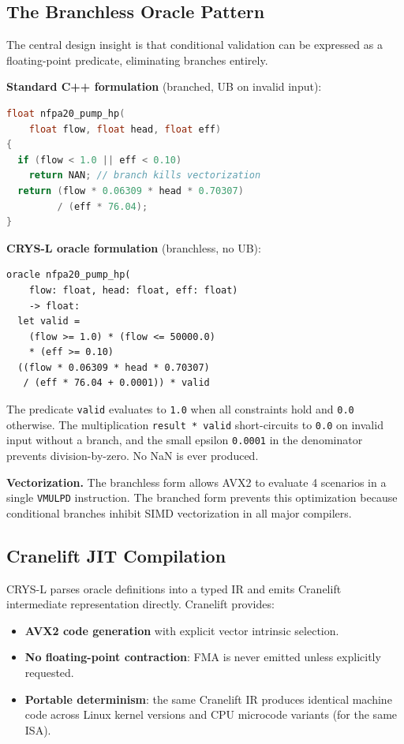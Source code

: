 \documentclass[10pt,twocolumn]{article}
\begin{document}
\subsection{The Branchless Oracle Pattern}

The central design insight is that conditional validation can be expressed as a
floating-point predicate, eliminating branches entirely.

\textbf{Standard C++ formulation} (branched, UB on invalid input):
\begin{lstlisting}[language=C++]
float nfpa20_pump_hp(
    float flow, float head, float eff)
{
  if (flow < 1.0 || eff < 0.10)
    return NAN; // branch kills vectorization
  return (flow * 0.06309 * head * 0.70307)
         / (eff * 76.04);
}
\end{lstlisting}

\textbf{CRYS-L oracle formulation} (branchless, no UB):
\begin{lstlisting}
oracle nfpa20_pump_hp(
    flow: float, head: float, eff: float)
    -> float:
  let valid =
    (flow >= 1.0) * (flow <= 50000.0)
    * (eff >= 0.10)
  ((flow * 0.06309 * head * 0.70307)
   / (eff * 76.04 + 0.0001)) * valid
\end{lstlisting}

The predicate \texttt{valid} evaluates to \texttt{1.0} when all constraints hold and
\texttt{0.0} otherwise. The multiplication \texttt{result * valid} short-circuits to
\texttt{0.0} on invalid input without a branch, and the small epsilon \texttt{0.0001}
in the denominator prevents division-by-zero. No NaN is ever produced.

\textbf{Vectorization.} The branchless form allows AVX2 to evaluate 4 scenarios
in a single \texttt{VMULPD} instruction. The branched form prevents this optimization
because conditional branches inhibit SIMD vectorization in all major compilers.

\subsection{Cranelift JIT Compilation}

CRYS-L parses oracle definitions into a typed IR and emits Cranelift~\cite{cranelift}
intermediate representation directly. Cranelift provides:

\begin{itemize}
\item \textbf{AVX2 code generation} with explicit vector intrinsic selection.
\item \textbf{No floating-point contraction}: FMA is never emitted unless explicitly requested.
\item \textbf{Portable determinism}: the same Cranelift IR produces identical machine code
  across Linux kernel versions and CPU microcode variants (for the same ISA).
\end{itemize}
\end{document}
